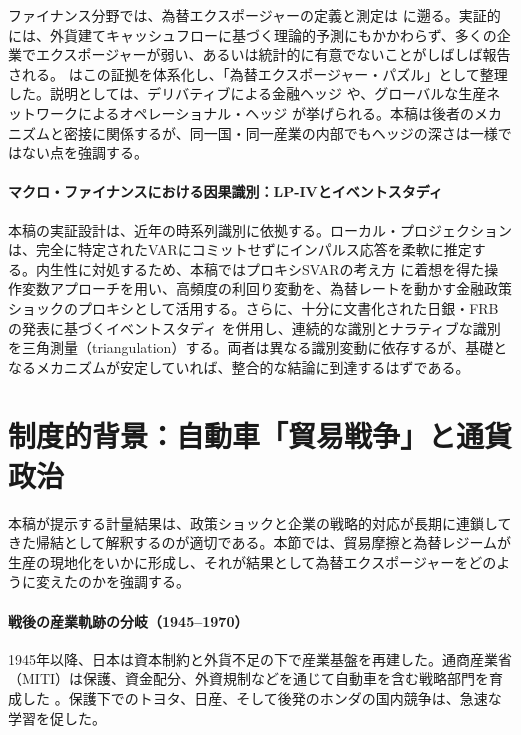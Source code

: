 \documentclass[12pt,a4paper]{article}
\begin{document}
ファイナンス分野では、為替エクスポージャーの定義と測定は \citet{adler1984} に遡る。実証的には、外貨建てキャッシュフローに基づく理論的予測にもかかわらず、多くの企業でエクスポージャーが弱い、あるいは統計的に有意でないことがしばしば報告される。\citet{bartram2010} はこの証拠を体系化し、「為替エクスポージャー・パズル」として整理した。説明としては、デリバティブによる金融ヘッジ \citep{bodnar2002,allayannis2001} や、グローバルな生産ネットワークによるオペレーショナル・ヘッジ \citep{pantzalis2001} が挙げられる。本稿は後者のメカニズムと密接に関係するが、同一国・同一産業の内部でもヘッジの深さは一様ではない点を強調する。

\paragraph{マクロ・ファイナンスにおける因果識別：LP-IVとイベントスタディ}

本稿の実証設計は、近年の時系列識別に依拠する。ローカル・プロジェクション \citep{jorda2005} は、完全に特定されたVARにコミットせずにインパルス応答を柔軟に推定する。内生性に対処するため、本稿ではプロキシSVARの考え方 \citep{stock2012,mertens2013} に着想を得た操作変数アプローチを用い、高頻度の利回り変動を、為替レートを動かす金融政策ショックのプロキシとして活用する。さらに、十分に文書化された日銀・FRBの発表に基づくイベントスタディ \citep{mackinlay1997} を併用し、連続的な識別とナラティブな識別を三角測量（triangulation）する。両者は異なる識別変動に依存するが、基礎となるメカニズムが安定していれば、整合的な結論に到達するはずである。

\section{制度的背景：自動車「貿易戦争」と通貨政治}

本稿が提示する計量結果は、政策ショックと企業の戦略的対応が長期に連鎖してきた帰結として解釈するのが適切である。本節では、貿易摩擦と為替レジームが生産の現地化をいかに形成し、それが結果として為替エクスポージャーをどのように変えたのかを強調する。

\paragraph{戦後の産業軌跡の分岐（1945--1970）}

1945年以降、日本は資本制約と外貨不足の下で産業基盤を再建した。通商産業省（MITI）は保護、資金配分、外資規制などを通じて自動車を含む戦略部門を育成した \citep{johnson1982}。保護下でのトヨタ、日産、そして後発のホンダの国内競争は、急速な学習を促した。
\end{document}
